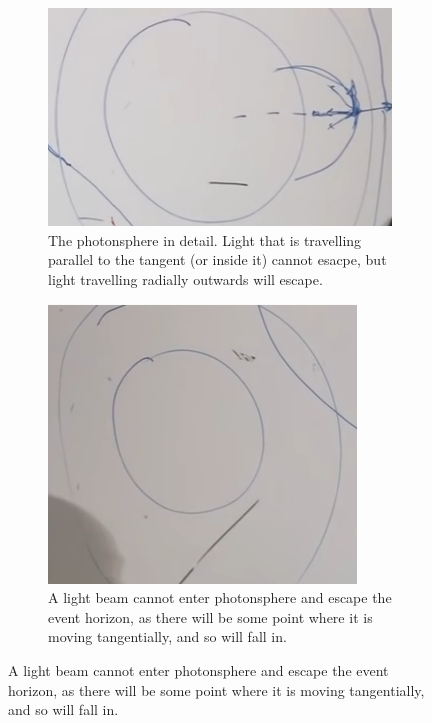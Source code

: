 \documentclass[]{article}
\begin{document}
{\begin{figure}[H]
	\caption{Light rays and the Photonsphere}
	\begin{subfigure}[t]{0.3\textwidth}
		\caption{The photonsphere in detail. Light that is travelling parallel to the tangent (or inside it) cannot esacpe, but light travelling radially outwards will escape.}\label{fig:gr-6-photon-sphere1}
		\includegraphics[width=\textwidth]{gr-6-photon-sphere1}
	\end{subfigure}
	\begin{subfigure}[t]{0.3\textwidth}
		\caption{A light beam cannot enter photonsphere and escape the event horizon, as there will be some point where it is moving tangentially, and so will fall in.}\label{fig:gr-6-photon-sphere2}
		\includegraphics[width=\textwidth]{gr-6-photon-sphere2}

\end{subfigure}
\end{figure}}
\end{document}
